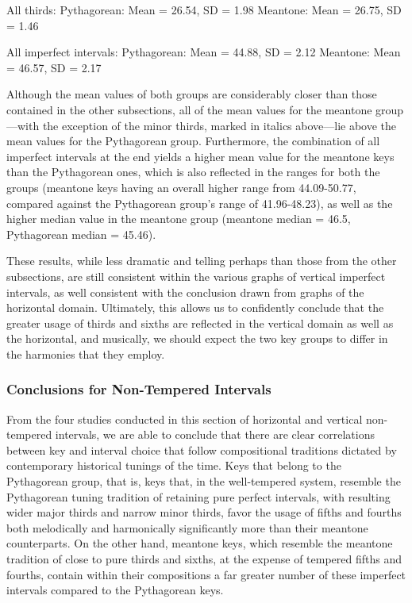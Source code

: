 All thirds: Pythagorean: Mean = 26.54, SD = 1.98 Meantone: Mean = 26.75,
SD = 1.46

All imperfect intervals: Pythagorean: Mean = 44.88, SD = 2.12 Meantone:
Mean = 46.57, SD = 2.17

Although the mean values of both groups are considerably closer than
those contained in the other subsections, all of the mean values for the
meantone group---with the exception of the minor thirds, marked in
italics above---lie above the mean values for the Pythagorean group.
Furthermore, the combination of all imperfect intervals at the end
yields a higher mean value for the meantone keys than the Pythagorean
ones, which is also reflected in the ranges for both the groups
(meantone keys having an overall higher range from 44.09-50.77, compared
against the Pythagorean group's range of 41.96-48.23), as well as the
higher median value in the meantone group (meantone median = 46.5,
Pythagorean median = 45.46).

These results, while less dramatic and telling perhaps than those from
the other subsections, are still consistent within the various graphs of
vertical imperfect intervals, as well consistent with the conclusion
drawn from graphs of the horizontal domain. Ultimately, this allows us
to confidently conclude that the greater usage of thirds and sixths are
reflected in the vertical domain as well as the horizontal, and
musically, we should expect the two key groups to differ in the
harmonies that they employ.

\subsubsection{Conclusions for Non-Tempered
Intervals}\label{conclusions-for-non-tempered-intervals}

From the four studies conducted in this section of horizontal and
vertical non-tempered intervals, we are able to conclude that there are
clear correlations between key and interval choice that follow
compositional traditions dictated by contemporary historical tunings of
the time. Keys that belong to the Pythagorean group, that is, keys that,
in the well-tempered system, resemble the Pythagorean tuning tradition
of retaining pure perfect intervals, with resulting wider major thirds
and narrow minor thirds, favor the usage of fifths and fourths both
melodically and harmonically significantly more than their meantone
counterparts. On the other hand, meantone keys, which resemble the
meantone tradition of close to pure thirds and sixths, at the expense of
tempered fifths and fourths, contain within their compositions a far
greater number of these imperfect intervals compared to the Pythagorean
keys.

